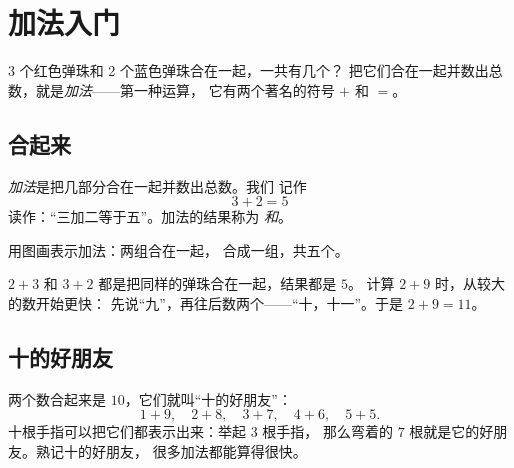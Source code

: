 \chapter{加法入门}\label{ch:g1:addition}

3 个红色弹珠和 2 个蓝色弹珠合在一起，一共有几个？
把它们合在一起并数出总数，就是\emph{加法}——第一种运算，
它有两个著名的符号 $+$ 和 $=$。

\section{合起来}

\begin{definition}[加法]\label{def:g1:addition:def}
\emph{加法}是把几部分合在一起并数出总数。我们
记作
\[
3 + 2 = 5
\]
读作：“三加二等于五”。加法的结果称为
\emph{和}。
\end{definition}

\begin{omfigure}

{\small 用图画表示加法：两组合在一起，
合成一组，共五个。}
\end{omfigure}

\begin{example}[加数的位置可以交换]\label{ex:g1:addition:order}
$2 + 3$ 和 $3 + 2$ 都是把同样的弹珠合在一起，结果都是 $5$。
计算 $2 + 9$ 时，从较大的数开始更快：
先说“九”，再往后数两个——“十，十一”。于是
$2 + 9 = 11$。
\end{example}

\section{十的好朋友}

\begin{example}[凑成十]\label{ex:g1:addition:friends}
两个数合起来是 $10$，它们就叫“十的好朋友”：
\[
1 + 9, \quad 2 + 8, \quad 3 + 7, \quad 4 + 6, \quad 5 + 5 .
\]
十根手指可以把它们都表示出来：举起 $3$ 根手指，
那么弯着的 $7$ 根就是它的好朋友。熟记十的好朋友，
很多加法都能算得很快。
\end{example}

